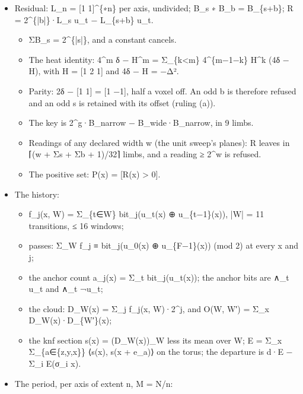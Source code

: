 \begin{itemize}
\item Residual: L\_\allowbreak{}n = [1 1]\textasciicircum{}\{∗n\} per axis, undivided; B\_\allowbreak{}s ∗ B\_\allowbreak{}b = B\_\allowbreak{}\{s+b\}; R = 2\textasciicircum{}\{|b|\}·L\_\allowbreak{}s u\_\allowbreak{}t − L\_\allowbreak{}\{s+b\} u\_\allowbreak{}t.

\begin{itemize}
\item ΣB\_\allowbreak{}s = 2\textasciicircum{}\{|s|\}, and a constant cancels.
\item The heat identity: 4\textasciicircum{}m δ − H\textasciicircum{}m = Σ\_\allowbreak{}\{k<m\} 4\textasciicircum{}\{m−1−k\} H\textasciicircum{}k (4δ − H), with H = [1 2 1] and 4δ − H = −Δ².
\item Parity: 2δ − [1 1] = [1 −1], half a voxel off. An odd b is therefore refused and an odd s is retained with its offset (ruling (a)).
\item The key is 2\textasciicircum{}g·B\_\allowbreak{}narrow − B\_\allowbreak{}wide·B\_\allowbreak{}narrow, in 9 limbs.
\item Readings of any declared width w (the unit sweep's planes): R leaves in ⌈(w + Σs + Σb + 1)/32⌉ limbs, and a reading ≥ 2\textasciicircum{}w is refused.
\item The positive set: P(x) = [R(x) > 0].
\end{itemize}
\item The history:

\begin{itemize}
\item f\_\allowbreak{}j(x, W) = Σ\_\allowbreak{}\{t∈W\} bit\_\allowbreak{}j(u\_\allowbreak{}t(x) ⊕ u\_\allowbreak{}\{t−1\}(x)), |W| = 11 transitions, ≤ 16 windows;
\item passes: Σ\_\allowbreak{}W f\_\allowbreak{}j ≡ bit\_\allowbreak{}j(u\_\allowbreak{}0(x) ⊕ u\_\allowbreak{}\{F−1\}(x)) (mod 2) at every x and j;
\item the anchor count a\_\allowbreak{}j(x) = Σ\_\allowbreak{}t bit\_\allowbreak{}j(u\_\allowbreak{}t(x)); the anchor bits are ∧\_\allowbreak{}t u\_\allowbreak{}t and ∧\_\allowbreak{}t ¬u\_\allowbreak{}t;
\item the cloud: D\_\allowbreak{}W(x) = Σ\_\allowbreak{}j f\_\allowbreak{}j(x, W)·2\textasciicircum{}j, and O(W, W′) = Σ\_\allowbreak{}x D\_\allowbreak{}W(x)·D\_\allowbreak{}\{W′\}(x);
\item the knf section s(x) = (D\_\allowbreak{}W(x))\_\allowbreak{}W less its mean over W; E = Σ\_\allowbreak{}x Σ\_\allowbreak{}\{a∈\{z,y,x\}\} ⟨s(x), s(x + e\_\allowbreak{}a)⟩ on the torus; the departure is d·E − Σ\_\allowbreak{}i E(σ\_\allowbreak{}i x).
\end{itemize}
\item The period, per axis of extent n, M = N/n:


\end{itemize}
